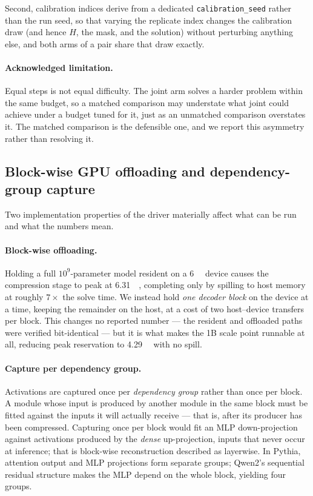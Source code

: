 Second, calibration indices derive from a dedicated \texttt{calibration\_seed} rather than
the run seed, so that varying the replicate index changes the calibration draw (and hence
$H$, the mask, and the solution) without perturbing anything else, and both arms of a pair
share that draw exactly.

\paragraph{Acknowledged limitation.} Equal steps is not equal difficulty. The joint arm
solves a harder problem within the same budget, so a matched comparison may understate what
joint could achieve under a budget tuned for it, just as an unmatched comparison overstates
it. The matched comparison is the defensible one, and we report this asymmetry rather than
resolving it.

\subsection{Block-wise GPU offloading and dependency-group capture}
\label{subsec:offload}

Two implementation properties of the driver materially affect what can be run and what the
numbers mean.

\paragraph{Block-wise offloading.} Holding a full $10^{9}$-parameter model resident on a
\SI{6}{\giga\byte} device causes the compression stage to peak at \SI{6.31}{\gibi\byte},
completing only by spilling to host memory at roughly $7\times$ the solve time. We instead
hold \emph{one decoder block} on the device at a time, keeping the remainder on the host, at
a cost of two host--device transfers per block. This changes no reported number --- the
resident and offloaded paths were verified bit-identical --- but it is what makes the 1B
scale point runnable at all, reducing peak reservation to \SI{4.29}{\gibi\byte} with no
spill.

\paragraph{Capture per dependency group.} Activations are captured once per
\emph{dependency group} rather than once per block. A module whose input is produced by
another module in the same block must be fitted against the inputs it will actually receive
--- that is, after its producer has been compressed. Capturing once per block would fit an
MLP down-projection against activations produced by the \emph{dense} up-projection, inputs
that never occur at inference; that is block-wise reconstruction described as layerwise. In
Pythia, attention output and MLP projections form separate groups; Qwen2's sequential
residual structure makes the MLP depend on the whole block, yielding four groups.

